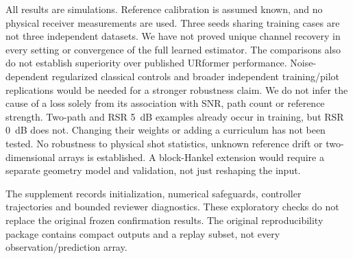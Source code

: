 \documentclass[journal]{IEEEtran}
\begin{document}
All results are simulations. Reference calibration is assumed known,
and no physical receiver measurements are used. Three seeds sharing
training cases are not three independent datasets. We have not proved
unique channel recovery in every setting or convergence of the full
learned estimator. The comparisons also do not establish superiority
over published URformer performance.
Noise-dependent regularized classical controls and broader independent
training/pilot replications would be needed for a stronger robustness
claim. We do not infer the cause of a loss solely from its association
with SNR, path count or reference strength.
Two-path and RSR 5~dB examples already occur in training, but RSR 0~dB
does not. Changing
their weights or adding a curriculum has not been tested. No robustness
to physical shot statistics, unknown reference drift or two-dimensional
arrays is established. A block-Hankel extension would require a separate
geometry model and validation, not just reshaping the input.

The supplement records initialization, numerical safeguards, controller
trajectories and bounded reviewer diagnostics. These exploratory checks
do not replace the original frozen confirmation results. The original
reproducibility package contains compact outputs and a replay subset,
not every observation/prediction array.


\end{document}
